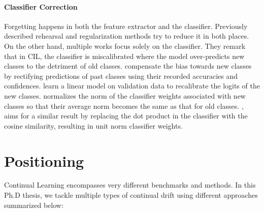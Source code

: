 \paragraph{Classifier Correction} Forgetting happens in both the feature extractor and the
classifier. Previously described rehearsal and regularization methods try to reduce it in both
places. On the other hand, multiple works focus solely on the classifier. They remark that in
\acf{CIL}, the classifier is miscalibrated \citep{guo2017miscalibration} where the model
over-predicts new classes to the detriment of old classes. \cite{belouadah2019il2m} compensate the
bias towards new classes by rectifying predictions of past classes using their recorded accuracies
and confidences. \cite{wu2019bias_correction} learn a linear model on validation data to recalibrate
the logits of the new classes. \cite{zhao2020weightalignement} normalizes the norm of the classifier
weights associated with new classes so that their average norm becomes the same as that for old
classes. \cite{hou2019ucir}, aims for a similar result by replacing the dot product in the
classifier with the cosine similarity, resulting in unit norm classifier weights.

\section{Positioning}

Continual Learning encompasses very different benchmarks and methods. In this Ph.D thesis, we tackle
multiple types of continual drift using different approaches summarized below:

